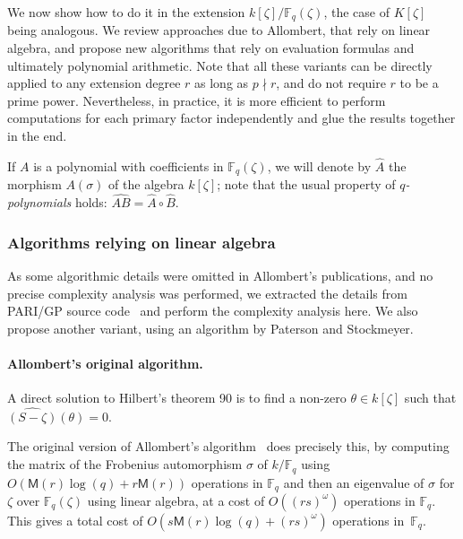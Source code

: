 \documentclass{mcom-l}
\theoremstyle{plain}
\theoremstyle{definition}
\newcommand{\F}{\ensuremath{\mathbb{F}}}
\newcommand{\MM}{\ensuremath{\mathsf{M}}}
\newcounter{algorithm}
\begin{document}
We now show how to do it in the extension $k[\zeta]/\F_q(\zeta)$, the
case of $K[\zeta]$ being analogous. We review approaches due to
Allombert, that rely on linear algebra, and propose new algorithms
that rely on evaluation formulas and ultimately polynomial
arithmetic. Note that all these variants can be directly applied to
any extension degree $r$ as long as $p \nmid r$, and do not require $r$
to be a prime power.  Nevertheless, in practice, it is more efficient
to perform computations for each primary factor independently and glue
the results together in the end.

If $A$ is a polynomial with coefficients in $\F_q(\zeta)$, we will
denote by $\hat{A}$ the morphism $A(\sigma)$ of the algebra
$k[\zeta]$; note that the usual property of \emph{$q$-polynomials}
holds: $\widehat{AB} = \hat{A}\circ\hat{B}$.

\subsubsection{Algorithms relying on linear algebra}
\label{sec:algor-rely-line}

As some algorithmic details were omitted in Allombert's publications,
and no precise complexity analysis was performed, we extracted the
details from PARI/GP source code~\cite{Pari} and perform the complexity analysis
here.  We also propose another variant, using an algorithm by Paterson
and Stockmeyer.

\paragraph{\bf Allombert's original algorithm.}
A direct solution to Hilbert's theorem 90 is to find a non-zero
$\theta\in k[\zeta]$ such that $\widehat{(S-\zeta)}(\theta)=0$.

The original version of Allombert's algorithm~\cite{Allombert02} does
precisely this, by computing the matrix of the Frobenius automorphism
$\sigma$ of $k/\F_q$ using $O(\MM(r) \log(q) + r \MM(r))$ operations
in $\F_q$ and then an eigenvalue of $\sigma$ for $\zeta$ over
$\F_q(\zeta)$ using linear algebra, at a cost of $O((rs)^\omega)$
operations in $\F_q$. This gives a total cost of $O(s \MM(r) \log(q) +
(rs)^{\omega})$ operations in~$\F_q$.
\end{document}
